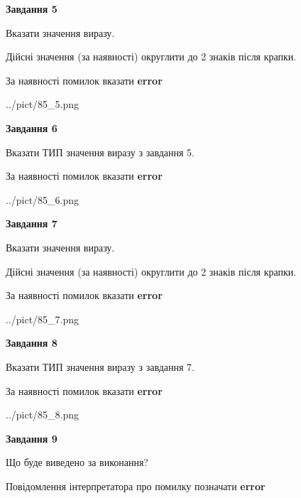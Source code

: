\documentclass[11pt, ukrainian]{article}
\begin{document}
{\begin {large}
{\begin {center}\textbf{Завдання 5}\end {center}}\par
Вказати значення виразу. \par
Дійсні значення (за наявності) округлити до 2 знаків після крапки. \par
За наявності помилок вказати \textbf{error}

\begin{center}
	{../pict/85_5.png}
\end{center}
\newpage

{\begin {center}\textbf{Завдання 6}\end {center}}\par
Вказати ТИП значення виразу з завдання 5. \par
За наявності помилок вказати \textbf{error}

\begin{center}
	{../pict/85_6.png}
\end{center}
\newpage

{\begin {center}\textbf{Завдання 7}\end {center}}\par
Вказати значення виразу. \par
Дійсні значення (за наявності) округлити до 2 знаків після крапки. \par
За наявності помилок вказати \textbf{error}

\begin{center}
	{../pict/85_7.png}
\end{center}
\newpage

{\begin {center}\textbf{Завдання 8}\end {center}}\par
Вказати ТИП значення виразу з завдання 7. \par
За наявності помилок вказати \textbf{error}

\begin{center}
	{../pict/85_8.png}
\end{center}
\newpage

{\begin {center}\textbf{Завдання 9}\end {center}}\par
Що буде виведено за виконання? \par
Повідомлення інтерпретатора про помилку позначати \textbf{error}


\end{large}}
\end{document}
